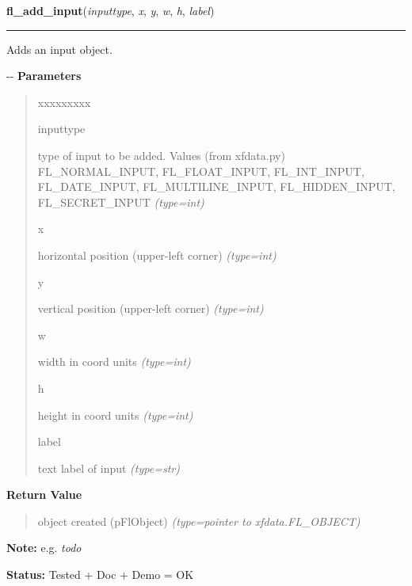     \vspace{0.5ex}

\hspace{.8\funcindent}\begin{boxedminipage}{\funcwidth}

    \raggedright \textbf{fl\_add\_input}(\textit{inputtype}, \textit{x}, \textit{y}, \textit{w}, \textit{h}, \textit{label})

    \vspace{-1.5ex}

    \rule{\textwidth}{0.5\fboxrule}
\setlength{\parskip}{2ex}

Adds an input object.

-{}-
\setlength{\parskip}{1ex}
      \textbf{Parameters}
      \vspace{-1ex}

      \begin{quote}
        \begin{Ventry}{xxxxxxxxx}

          \item[inputtype]


type of input to be added. Values (from xfdata.py) FL\_NORMAL\_INPUT,
FL\_FLOAT\_INPUT, FL\_INT\_INPUT, FL\_DATE\_INPUT, FL\_MULTILINE\_INPUT,
FL\_HIDDEN\_INPUT, FL\_SECRET\_INPUT
            {\it (type=int)}

          \item[x]


horizontal position (upper-left corner)
            {\it (type=int)}

          \item[y]


vertical position (upper-left corner)
            {\it (type=int)}

          \item[w]


width in coord units
            {\it (type=int)}

          \item[h]


height in coord units
            {\it (type=int)}

          \item[label]


text label of input
            {\it (type=str)}

        \end{Ventry}

      \end{quote}

      \textbf{Return Value}
    \vspace{-1ex}

      \begin{quote}

object created (pFlObject)
      {\it (type=pointer to xfdata.FL\_OBJECT)}

      \end{quote}

\textbf{Note:} 
e.g. \emph{todo}


\textbf{Status:} 
Tested + Doc + Demo = OK


    \end{boxedminipage}

